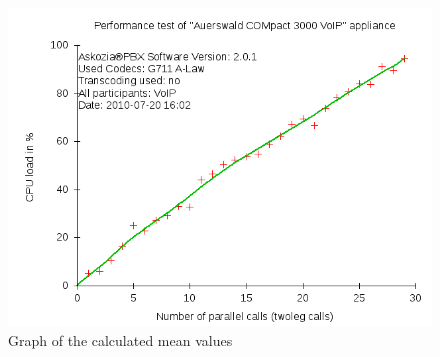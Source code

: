 \begin{figure} [!ht]
\centering
\includegraphics [width=12cm] {qstat-4}
\caption{Graph of the calculated mean values}
\label{fig:qstat-graph}
\end{figure}



